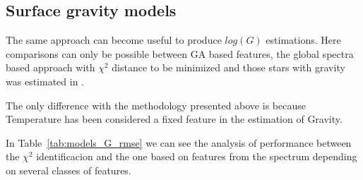 %

\subsection{Surface gravity models}

The same approach can become useful to produce $log(G)$ estimations. 
Here comparisons can only be possible between GA based features, the 
global spectra based approach with $\chi^2$ distance
to be minimized and those stars with gravity was 
estimated in  \cite{2013A&A...549A.129C}.

The only difference with the methodology presented above is because
Temperature has been considered a fixed feature in the estimation of 
Gravity.

In Table~\ref{tab:models_G_rmse} 
we can see the analysis of performance between
the $\chi^2$ identificacion and the one based on features from the spectrum
depending on several classes of features.

